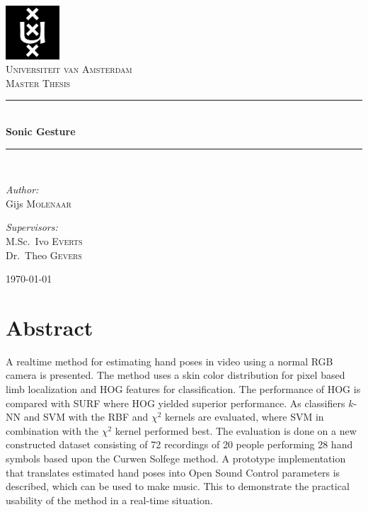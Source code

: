 \documentclass[a4paper, 11pt]{book}
\newcommand{\HRule}{\rule{\linewidth}{0.5mm}}
\begin{document}
\thispagestyle{empty}

\begin{titlepage}
\begin{center}

\includegraphics[width=0.15\textwidth]{./figures/uva.png}\\[1cm]
\textsc{\LARGE Universiteit van Amsterdam}\\[1.5cm]
\textsc{\Large Master Thesis}\\[0.5cm]

\HRule \\[0.4cm]
{ \huge \bfseries Sonic Gesture}\\[0.4cm]

\HRule \\[1.5cm]

\begin{minipage}{0.4\textwidth}
\begin{flushleft} \large
\emph{Author:}\\
Gijs \textsc{Molenaar}
\end{flushleft}
\end{minipage}
\begin{minipage}{0.4\textwidth}
\begin{flushright} \large
\emph{Supervisors:} \\
M.Sc.~Ivo \textsc{Everts} \\
Dr.~Theo \textsc{Gevers}
\end{flushright}
\end{minipage}

\vfill

{\large \today}

\end{center}
\end{titlepage}



\chapter*{Abstract}
A real\-time method for estimating hand poses in video using a normal RGB camera is presented. The method uses a skin color distribution for pixel based limb localization and HOG features for classification. The performance of HOG is compared with SURF where HOG yielded superior performance. As classifiers $k$-NN and SVM with the RBF and $\chi^2$ kernels are evaluated, where SVM in combination with the $\chi^2$ kernel performed best. The evaluation is done on a new constructed dataset consisting of 72 recordings of 20 people performing 28 hand symbols based upon the Curwen Solfege method. A prototype implementation that translates estimated hand poses into Open Sound Control parameters is described, which can be used to make music. This to demonstrate the practical usability of the method in a real-time situation.
\end{document}
